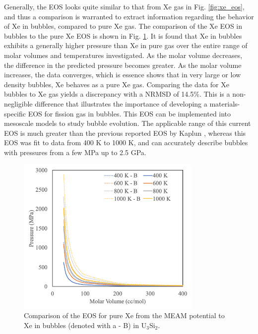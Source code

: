 \documentclass[review]{elsarticle}
\begin{document}
\FloatBarrier

Generally, the EOS looks quite similar to that from Xe gas in Fig. \ref{fig:xe_eos}, and thus a comparison is warranted to extract information regarding the behavior of Xe in bubbles, compared to pure Xe gas. The comparison of the Xe EOS in bubbles to the pure Xe EOS is shown in Fig. \ref{fig:eos_comp}. It is found that Xe in bubbles exhibits a generally higher pressure than Xe in pure gas over the entire range of molar volumes and temperatures investigated. As the molar volume decreases, the difference in the predicted pressure becomes greater. As the molar volume increases, the data converges, which is essence shows that in very large or low density bubbles, Xe behaves as a pure Xe gas. Comparing the data for Xe bubbles to Xe gas yields a discrepancy with a NRMSD of 14.5\%. This is a non-negligible difference that illustrates the importance of developing a materials-specific EOS for fission gas in bubbles. This EOS can be implemented into mesoscale models to study bubble evolution. The applicable range of this current EOS is much greater than the previous reported EOS by Kaplun \cite{kaplun2003}, whereas this EOS was fit to data from 400 K to 1000 K, and can accurately describe bubbles with pressures from a few MPa up to 2.5 GPa.

\begin{figure}[hbt]
	\centering
	\includegraphics[width=0.8\textwidth]{xe_eos_compa.png}
 \caption{Comparison of the EOS for pure Xe from the MEAM potential to Xe in bubbles (denoted with a - B) in U$_3$Si$_2$.}\label{fig:eos_comp}
\end{figure}

\FloatBarrier
\end{document}
